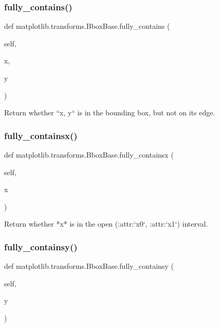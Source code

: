 \subsubsection{\texorpdfstring{fully\+\_\+contains()}{fully\_contains()}}
{\footnotesize\ttfamily def matplotlib.\+transforms.\+Bbox\+Base.\+fully\+\_\+contains (\begin{DoxyParamCaption}\item[{}]{self,  }\item[{}]{x,  }\item[{}]{y }\end{DoxyParamCaption})}

\begin{DoxyVerb}Return whether ``x, y`` is in the bounding box, but not on its edge.
\end{DoxyVerb}
 \mbox{\label{classmatplotlib_1_1transforms_1_1BboxBase_a6147bd3ab9a9a00e2641c0b68f28851f}} 
\subsubsection{\texorpdfstring{fully\+\_\+containsx()}{fully\_containsx()}}
{\footnotesize\ttfamily def matplotlib.\+transforms.\+Bbox\+Base.\+fully\+\_\+containsx (\begin{DoxyParamCaption}\item[{}]{self,  }\item[{}]{x }\end{DoxyParamCaption})}

\begin{DoxyVerb}Return whether *x* is in the open (:attr:`x0`, :attr:`x1`) interval.
\end{DoxyVerb}
 \mbox{\label{classmatplotlib_1_1transforms_1_1BboxBase_a76bb64e8436e0f57c423009b67e8b754}} 
\subsubsection{\texorpdfstring{fully\+\_\+containsy()}{fully\_containsy()}}
{\footnotesize\ttfamily def matplotlib.\+transforms.\+Bbox\+Base.\+fully\+\_\+containsy (\begin{DoxyParamCaption}\item[{}]{self,  }\item[{}]{y }\end{DoxyParamCaption})}

